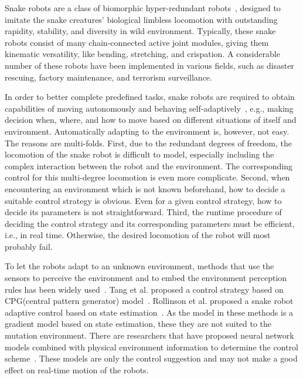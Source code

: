 Snake robots are a class of biomorphic hyper-redundant
robots~\cite{Chirikjian1995The}, designed to imitate the snake
creatures’ biological limbless locomotion with outstanding rapidity,
stability, and diversity in wild environment. Typically, these
snake robots consist of many chain-connected active joint
modules, giving them kinematic versatility, like bending, stretching,
and crispation.  A considerable number of these robots have been
implemented in various fields, such as disaster rescuing, factory
maintenance, and terrorism surveillance.

In order to better complete predefined tasks, snake robots are
required to obtain capabilities of moving autonomously and behaving
self-adaptively~\cite{Liljeb2013Snake}, e.g., making decision when,
where, and how to move based on different situations of itself and
environment. Automatically adapting to the environment is, however,
not easy. The reasons are multi-folds. First, due to the redundant
degrees of freedom, the locomotion of the snake robot is
difficult to model, especially including the complex interaction
between the robot and the environment.  The corresponding control for
this multi-degree locomotion is even more complicate. Second, when
encountering an environment which is not known beforehand, how to
decide a suitable control strategy is obvious. Even for a given
control strategy, how to decide its parameters is not
straightforward. Third, the runtime procedure of deciding the control
strategy and its corresponding parameters must be efficient, i.e., in
real time. Otherwise, the desired locomotion of the robot will most
probably fail.

To let the robots adapt to an unknown environment, methods that use
the sensors to perceive the environment and to embed the environment
perception rules has been widely
used~\cite{CPGenabling,GaitBasedCompliant,BalancingAndControl,FeedbackControlOfSoft}. Tang
et al. proposed a control strategy based on CPG(central pattern
generator) model~\cite{CPGenabling}. Rollinson et al. proposed a
snake robot adaptive control based on state
estimation~\cite{GaitBasedCompliant}.  As the model in these methods is
a gradient model based on state estimation, these they are not suited
to the mutation environment.
There are researchers that have proposed neural network models
combined with physical environment information to determine the
control
scheme~\cite{InformationDriven,NovelPlasticityRule,MissileSystems,NeuroFuzzyBayesian}. These
models are only the control suggestion and may not make a good effect
on real-time motion of the robots.

